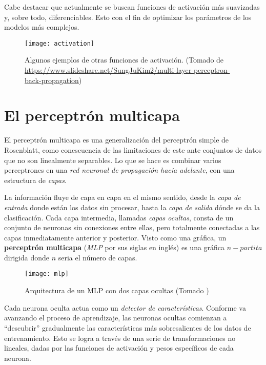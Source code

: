 Cabe destacar que actualmente se buscan funciones de activación más
suavizadas y, sobre todo, diferenciables. Esto con el fin de optimizar
los parámetros de los modelos más complejos.

\begin{figure}[H]
  \texttt{[image: activation]} \centering
  \caption{Algunos ejemplos de otras funciones de activación.  (Tomado
    de
    \url{https://www.slideshare.net/SungJuKim2/multi-layer-perceptron-back-propagation})}
\end{figure}

\section{El perceptrón multicapa}
El perceptrón multicapa es una generalización del perceptrón simple de
Rosenblatt, como conescuencia de las limitaciones de este ante
conjuntos de datos que no son linealmente separables. Lo que se hace
es combinar varios perceptrones en una \textit{red neuronal de
  propagación hacia adelante}, con una estructura de \textit{capas}.

La información fluye de capa en capa en el mismo sentido, desde la
\textit{capa de entrada} donde están los datos sin procesar, hasta la
\textit{capa de salida} dónde se da la clasificación. Cada capa
intermedia, llamadas \textit{capas ocultas}, consta de un conjunto de
neuronas sin conexiones entre ellas, pero totalmente conectadas a las
capas inmediatamente anterior y posterior. Visto como una gráfica, un
\textbf{perceptrón multicapa} (\textit{MLP} por sus siglas en inglés)
es una gráfica $n-partita$ dirigida donde $n$ seria el número de
capas.
\begin{figure}[H]
  \texttt{[image: mlp]} \centering
  \caption{Arquitectura de un MLP con dos capas ocultas (Tomado
    \cite{haykin})}
\end{figure}
Cada neurona oculta actua como un \textit{detector de
  características}. Conforme va avanzando el proceso de aprendizaje,
las neuronas ocultas comienzan a ``descubrir'' gradualmente las
características más sobresalientes de los datos de entrenamiento.
Esto se logra a través de una serie de transformaciones no lineales,
dadas por las funciones de activación y pesos específicos de cada
neurona.


